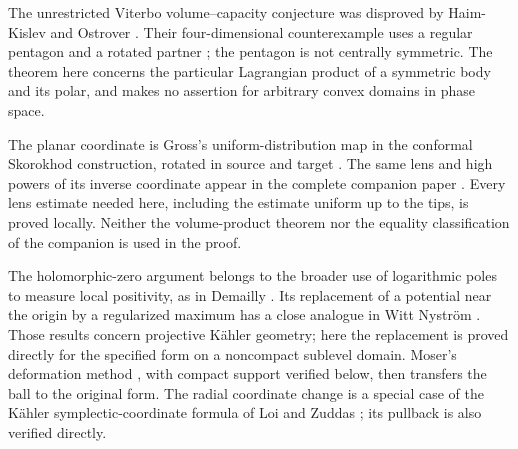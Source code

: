 The unrestricted Viterbo volume--capacity conjecture was disproved by
Haim-Kislev and Ostrover \cite{HKO2025}. Their four-dimensional
counterexample uses a regular pentagon and a rotated partner
\cite[Theorem~1.3 and Proposition~1.4]{HKO2025}; the pentagon is not
centrally symmetric. The theorem here concerns the particular
Lagrangian product of a symmetric body and its polar, and makes no
assertion for arbitrary convex domains in phase space.

The planar coordinate is Gross's uniform-distribution map in the
conformal Skorokhod construction, rotated in source and target
\cite[Section~3.2]{Gross2019}. The same lens and high powers of its
inverse coordinate appear in the complete companion paper
\cite[Section~3 and proof of Lemma~5.1]{SymmetricCompanion2026}.
Every lens estimate needed here, including the estimate uniform up to
the tips, is proved locally.
Neither the volume-product theorem nor the equality classification of
the companion is used in the proof.

The holomorphic-zero argument belongs to the broader use of logarithmic
poles to measure local positivity, as in Demailly
\cite[Section~6]{Demailly1992}. Its replacement of a potential near the
origin by a regularized maximum has a close analogue in Witt Nystr\"om
\cite[Proposition~3.3]{WittNystrom2018}. Those results concern projective
K\"ahler geometry; here the replacement is proved directly for the
specified form on a noncompact sublevel domain. Moser's deformation
method \cite[Section~4]{Moser1965}, with compact support verified below,
then transfers the ball to the original form. The radial coordinate
change is a special case of the K\"ahler symplectic-coordinate formula of
Loi and Zuddas \cite[proof of Theorem~1.1, equation~(23)]{LoiZuddas2008};
its pullback is also verified directly.
